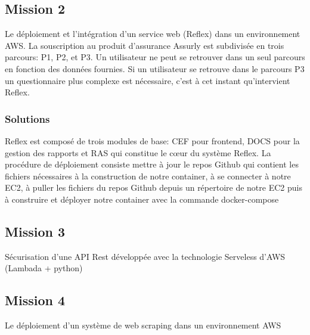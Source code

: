 \subsection{Mission 2}
Le déploiement et l’intégration d’un service web (Reflex) dans un environnement AWS. La souscription
au produit d’assurance Assurly est subdivisée en trois parcours: P1, P2, et P3. Un utilisateur ne peut se
retrouver dans un seul parcours en fonction des données fournies. Si un utilisateur se retrouve dans le
parcours P3 un questionnaire plus complexe est nécessaire, c’est à cet instant qu’intervient Reflex.

\subsubsection{Solutions}
Reflex est composé de trois modules de base: CEF pour frontend, DOCS pour la gestion des rapports et
RAS qui constitue le cœur du système Reflex.
La procédure de déploiement consiste mettre à jour le repos Github qui contient les fichiers nécessaires à la
construction de notre container, à se connecter à notre EC2, à puller les fichiers du repos Github depuis un
répertoire de notre EC2 puis à construire et déployer notre container avec la commande docker-compose
\subsection{Mission 3}
Sécurisation d’une API Rest développée avec la technologie Serveless d’AWS (Lambada + python)
\subsection{Mission 4}
Le déploiement d’un système de web scraping dans un environnement AWS
